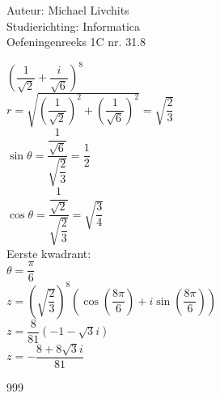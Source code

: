 \documentclass[a4paper]{article}
\begin{document}
  
\noindent \large Auteur: Michael Livchits \\
\noindent \large Studierichting: Informatica\\
\noindent \large Oefeningenreeks 1C nr. 31.8\\

\medskip

\normalsize

$\left(\dfrac{1}{\sqrt{2}}+\dfrac{i}{\sqrt{6}}\right)^8$\\

$r = \sqrt{\left(\dfrac{1}{\sqrt{2}}\right)^2+\left(\dfrac{1}{\sqrt{6}}\right)^2} = \sqrt{\dfrac{2}{3}}$\\

$\sin\theta = \dfrac{\dfrac{1}{\sqrt{6}}}{\sqrt{\dfrac{2}{3}}} = \dfrac{1}{2}$\\

$\cos\theta = \dfrac{\dfrac{1}{\sqrt{2}}}{\sqrt{\dfrac{2}{3}}} = \sqrt{\dfrac{3}{4}}$\\

Eerste kwadrant:\\

$\theta = \dfrac{\pi}{6}$\\

$z = \left(\sqrt{\dfrac{2}{3}}\right)^8\left(\cos\left(\dfrac{8\pi}{6}\right)+i\sin\left(\dfrac{8\pi}{6}\right)\right)$\\

$z = \dfrac{8}{81}\left(-1-\sqrt{3}i\right)$\\

$z = -\dfrac{8+8\sqrt{3}i}{81}$\\

\begin{thebibliography}{999}
\end{thebibliography}
\end{document}
